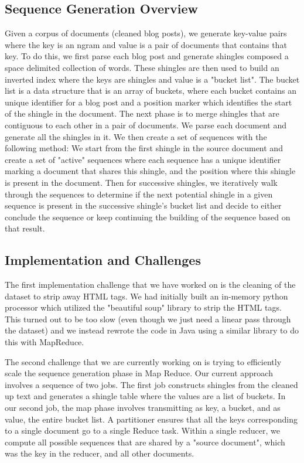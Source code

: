 \documentclass{acm_proc_article-sp}
\begin{document}
\subsection{Sequence Generation Overview}
Given a corpus of documents (cleaned blog posts), we generate key-value pairs where the key is an ngram and value is a pair of documents that contains that key. To do this, we first parse each blog post and generate shingles composed a space delimited collection of words. These shingles are then used to build an inverted index where the keys are shingles and value is a "bucket list". The bucket list is a data structure that is an array of buckets, where each bucket contains an unique identifier for a blog post and a position marker which identifies the start of the shingle in the document. The next phase is to merge shingles that are contiguous to each other in a pair of documents. We parse each document and generate all the shingles in it. We then create a set of sequences with the following method: We start from the first shingle in the source document and create a set of "active" sequences where each sequence has a unique identifier marking a document that shares this shingle, and the position where this shingle is present in the document. Then for successive shingles, we iteratively walk through the sequences to determine if the next potential shingle in a given sequence is present in the successive shingle's bucket list and decide to either conclude the sequence or keep continuing the building of the sequence based on that result. 

\subsection{Implementation and Challenges}
The first implementation challenge that we have worked on is the cleaning of the dataset to strip away HTML tags. We had initially built an in-memory python processor which utilized the "beautiful soup" library to strip the HTML tags. This turned out to be too slow (even though we just need a linear pass through the dataset) and we instead rewrote the code in Java using a similar library to do this with MapReduce.

The second challenge that we are currently working on is trying to efficiently scale the sequence generation phase in Map Reduce. Our current approach involves a sequence of two jobs. The first job constructs shingles from the cleaned up text and generates a shingle table where the values are a list of buckets. In our second job, the map phase involves transmitting as key, a bucket, and as value, the entire bucket list. A partitioner ensures that all the keys corresponding to a single document go to a single Reduce task. Within a single reducer, we compute all possible sequences that are shared by a "source document", which was the key in the reducer, and all other documents. 
 
\end{document}
